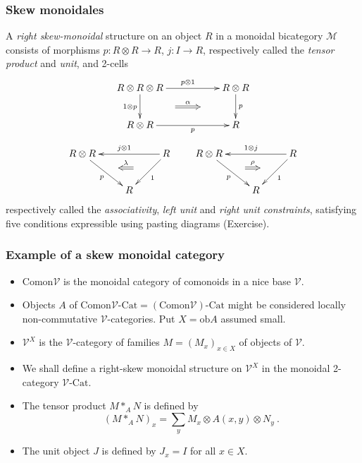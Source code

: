 \documentclass{beamer}
\newcommand{\lra}{\longrightarrow}
\def\CM{{\mathscr M}}
\def\CV{{\mathscr V}}
\begin{document}
\begin{frame}
  \frametitle{Skew monoidales}
  A {\em right skew-monoidal} structure on an object $R$ in a monoidal bicategory $\CM$ 
consists of morphisms \hbox{$p:R\otimes R \lra R$}, $j:I\lra R$, respectively called the {\em tensor product} and {\em unit}, and 2-cells 
\begin{equation*}
\begin{aligned}
\xymatrix{
R\otimes R\otimes R \ar[d]_{1\otimes p}^(0.5){\phantom{AAAAA}}="1" \ar[rr]^{p\otimes 1}  && R\otimes R \ar[d]^{p}_(0.5){\phantom{AAAAA}}="2" \ar@{=>}"1";"2"^-{\alpha}
\\
R\otimes R \ar[rr]_-{p} && R 
}
\end{aligned}
\end{equation*}
\begin{equation*}
\begin{aligned}
\xymatrix{
R\otimes R \ar[rd]_{p}^(0.5){\phantom{aa}}="1"   && R \ar[ll]_{j\otimes 1}  \ar[ld]^{1}_(0.5){\phantom{aa}}="2" \ar@{<=}"1";"2"^-{\lambda}
\\
& R }
\end{aligned}
\qquad
\begin{aligned}
\xymatrix{
R\otimes R \ar[rd]_{p}^(0.5){\phantom{aa}}="1"   && R \ar[ll]_{1\otimes j}  \ar[ld]^{1}_(0.5){\phantom{aa}}="2" \ar@{=>}"1";"2"^-{\rho}
\\
& R }
\end{aligned}
\end{equation*}
respectively called the {\em associativity}, {\em left unit} and {\em right unit constraints}, satisfying five conditions expressible using pasting diagrams (Exercise). 
\end{frame}

\begin{frame}
  \frametitle{Example of a skew monoidal category}
  
 \begin{itemize}
\item<1-> $\mathrm{Comon}\CV$ is the monoidal category of comonoids in a nice base $\CV$.
\item<2-> Objects $A$ of $\mathrm{Comon}\CV \text{-}\mathrm{Cat} = (\mathrm{Comon}\CV) \text{-}\mathrm{Cat}$ might be considered locally non-commutative $\CV$-categories. Put $X=\mathrm{ob}A$ assumed small.
\item<3-> $\CV^X$ is the $\CV$-category of families $M=(M_x)_{x\in X}$
of objects of $\CV$. 
\item<4-> We shall define a right-skew monoidal structure on $\CV^X$ in the monoidal 2-category $\CV \text{-}\mathrm{Cat}$. 
\item<5-> The tensor product $M\ast_A N$ is defined by
$$(M\ast_A N)_x = \sum_y{M_x \otimes A(x,y) \otimes N_y} \ .$$
\item<6-> The unit object $J$ is defined by $J_x=I$ for all $x\in X$.
\end{itemize}
\end{frame}
\end{document}

